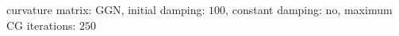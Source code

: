 curvature matrix: $\text{GGN}$, initial damping: $\num[scientific-notation=false]{100}$, constant damping: $\text{no}$, maximum CG iterations: $\num[scientific-notation=false]{250}$